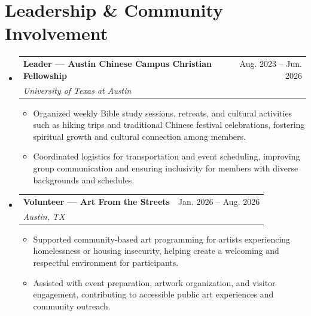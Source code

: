\documentclass[letterpaper,11pt]{article}
\makeatletter
\newcommand{\resumeItem}[1]{\item\footnotesize{{#1 \vspace{-5pt}}}}
\newcommand{\resumeSubheading}[4]{
  \vspace{-4.3pt}\item
    \begin{tabular*}{0.97\textwidth}[t]{l@{\extracolsep{\fill}}r}
      \textbf{#1} & \small#2 \\
      \textit{\small#3} & \small#4 \\
    \end{tabular*}\vspace{-8pt}
}
\newcommand{\resumeSubHeadingListStart}{\begin{itemize}[leftmargin=0.15in, label={}]}
\newcommand{\resumeSubHeadingListEnd}{\end{itemize}}
\newcommand{\resumeItemListStart}{\begin{itemize}}
\newcommand{\resumeItemListEnd}{\end{itemize}\vspace{-5pt}}
\makeatother
\begin{document}
\section{Leadership \& Community Involvement}
\resumeSubHeadingListStart
    \resumeSubheading
      {Leader — Austin Chinese Campus Christian Fellowship}{Aug. 2023 – Jun. 2026}
      {University of Texas at Austin}{}
      \resumeItemListStart
        \resumeItem{Organized weekly Bible study sessions, retreats, and cultural activities such as hiking trips and traditional Chinese festival celebrations, fostering spiritual growth and cultural connection among members.}
        \resumeItem{Coordinated logistics for transportation and event scheduling, improving group communication and ensuring inclusivity for members with diverse backgrounds and schedules.}
      \resumeItemListEnd

          \resumeSubheading
      {Volunteer — Art From the Streets}{Jan. 2026 – Aug. 2026}
      {Austin, TX}{}
      \resumeItemListStart
        \resumeItem{Supported community-based art programming for artists experiencing homelessness or housing insecurity, helping create a welcoming and respectful environment for participants.}
        \resumeItem{Assisted with event preparation, artwork organization, and visitor engagement, contributing to accessible public art experiences and community outreach.}
      \resumeItemListEnd
      
    
    \resumeSubHeadingListEnd


\end{document}
